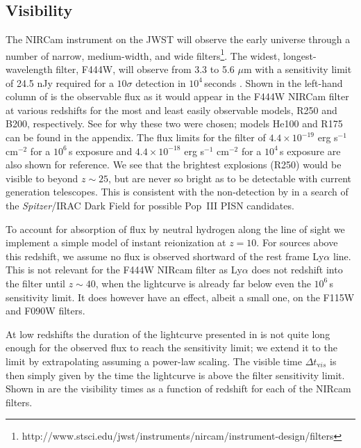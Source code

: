 \documentclass[../thesis.tex]{subfiles}
\begin{document}
\subsection{Visibility}
The NIRCam instrument on the JWST will observe the early universe
through a number of narrow, medium-width, and wide
filters\footnote{http://www.stsci.edu/jwst/instruments/nircam/instrument-design/filters}.
The widest, longest-wavelength filter, F444W, will observe from 3.3 to
5.6 $\mu$m with a sensitivity limit of 24.5 nJy required for a
$10\sigma$ detection in $10^4\,$seconds \citep{Gardneretal2006}. Shown
in the left-hand column of  is the observable flux
as it would appear in the F444W NIRCam filter at various redshifts for
the most and least easily observable models, R250 and B200,
respectively. See  for why these two were
chosen; models He100 and R175 can be found in the appendix.  The flux
limits for the filter of $4.4 \times 10^{-19}$ erg s$^{-1}$ cm$^{-2}$
for a $10^6\,$s exposure and $4.4 \times 10^{-18}$ erg s$^{-1}$
cm$^{-2}$ for a $10^4\,$s exposure are also shown for reference.  We
see that the brightest explosions (R250) would be visible to beyond
$z\sim25$, but are never so bright as to be detectable with current
generation telescopes.  This is consistent with the non-detection by
\citet{Frostetal2009} in a search of the \textit{Spitzer}/IRAC Dark Field
for possible Pop~III PISN candidates.

To account for absorption of flux by neutral hydrogen along the line
of sight we implement a simple model of instant reionization at
$z=10$.  For sources above this redshift, we assume no flux is
observed shortward of the rest frame Ly$\alpha$ line.  This is not
relevant for the F444W NIRcam filter as Ly$\alpha$ does not redshift
into the filter until $z\sim40$, when the lightcurve is already far
below even the $10^6\,$s sensitivity limit.  It does however have an
effect, albeit a small one, on the F115W and F090W filters.

At low redshifts the duration of the lightcurve presented in
\citet{KasenWoosleyHeger2011} is not quite long enough for the
observed flux to reach the sensitivity limit; we extend it to the
limit by extrapolating assuming a power-law scaling.  The visible time
$\Delta t_{\mathrm vis}$ is then simply given by the time the lightcurve
is above the filter sensitivity limit.  Shown in 
are the visibility times as a function of redshift for each of the
NIRcam filters.  
\end{document}
